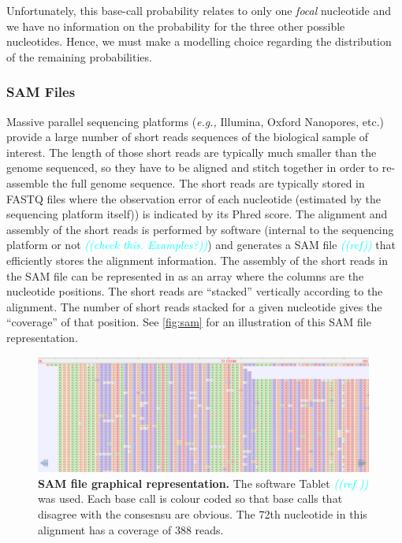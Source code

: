 \documentclass[
]{article}
\newcommand{\comment}[1]{\textsl{\textcolor{cyan}{((#1))}}}
\newcommand{\eg}{\textit{e.g.,}\xspace}
\begin{document}
Unfortunately, this base-call probability relates to only one
\emph{focal} nucleotide and we have no information on the probability
for the three other possible nucleotides. Hence, we must make a
modelling choice regarding the distribution of the remaining
probabilities.

\hypertarget{sam-files}{%
\subsubsection{SAM Files}\label{sam-files}}

Massive parallel sequencing platforms (\eg Illumina, Oxford Nanopores,
etc.) provide a large number of short reads sequences of the biological
sample of interest. The length of those short reads are typically much
smaller than the genome sequenced, so they have to be aligned and stitch
together in order to re-assemble the full genome sequence. The short
reads are typically stored in FASTQ files where the observation error of
each nucleotide (estimated by the sequencing platform itself)) is
indicated by its Phred score. The alignment and assembly of the short
reads is performed by software (internal to the sequencing platform or
not \comment{check this. Examples?}) and generates a SAM file
\comment{ref} that efficiently stores the alignment information. The
assembly of the short reads in the SAM file can be represented in as an
array where the columns are the nucleotide positions. The short reads
are ``stacked'' vertically according to the alignment. The number of
short reads stacked for a given nucleotide gives the ``coverage'' of
that position. See \autoref{fig:sam} for an illustration of this SAM
file representation.

\begin{figure}[ht]
\centering
    \includegraphics[width=0.99\textwidth]{../ms/figs/sam-tablet.png}
\caption{\textbf{SAM file graphical representation.} The software Tablet \comment{ref } was used. Each base call is colour coded so that base calls that disagree with the consesnsu are obvious. The 72th nucleotide in this alignment has a coverage of 388 reads.}
\label{fig:sam}
\end{figure}
\end{document}
